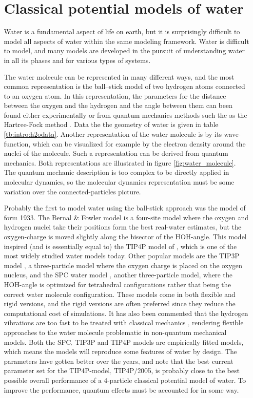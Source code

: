 \section{Classical potential models of water}
Water is a fundamental aspect of life on earth, but it is surprisingly difficult to model all aspects of water within the same modeling framework. Water is difficult to model, and many models are developed in the pursuit of understanding water in all its phases and for various types of systems.

The water molecule can be represented in many different ways, and the most common representation is the ball–stick model of two hydrogen atoms connected to an oxygen atom. In this representation, the parameters for the distance between the oxygen and the hydrogen and the angle between them can been found either experimentally or from quantum mechanics methods such the as the Hartree-Fock method \cite{fock1930naherungsmethode,slater1930note}. Data the the geometry of water is given in table \ref{tb:intro:h2odata}. Another representation of the water molecule is by its wave-function, which can be visualized for example by the electron density around the nuclei of the molecule. Such a representation can be derived from quantum mechanics. Both representations are illustrated in figure \ref{fig:water_molecule}. The quantum mechanic description is too complex to be directly applied in molecular dynamics, so the molecular dynamics representation must be some variation over the connected-particles picture. 

Probably the first to model water using the ball-stick approach was the model of \citet{bernal1933theory} form 1933. The Bernal \& Fowler model is a four-site model where the oxygen and hydrogen nuclei take their positions form the best real-water estimates, but the oxygen-charge is moved slightly along the bisector of the HOH-angle.  This model inspired (and is essentially equal to) the TIP4P model of \citet{Jorgensen1983}, which is one of the most widely studied water models today. Other popular models are the TIP3P model \cite{Jorgensen1983}, a three-particle model where the oxygen charge is placed on the oxygen nucleus, and the SPC water model \cite{berendsen1981interaction}, another three-particle model, where the HOH-angle is optimized for tetrahedral configurations rather that being the correct water molecule configuration. These models come in both flexible and rigid versions, and the rigid versions are often preferred since they reduce the computational cost of simulations. It has also been commented that the hydrogen vibrations are too fast to be treated with classical mechanics \cite{Vega2011}, rendering flexible approaches to the water molecule problematic in non-quantum mechanical models. Both the SPC, TIP3P and TIP4P models are empirically fitted models, which means the models will reproduce some features of water by design. The parameters have gotten better over the years, and \citet{Vega2011} note that the best current parameter set for the TIP4P-model, TIP4P/2005, is probably close to the best possible overall performance of a 4-particle classical potential model of water. To improve the performance, quantum effects must be accounted for in some way. 


